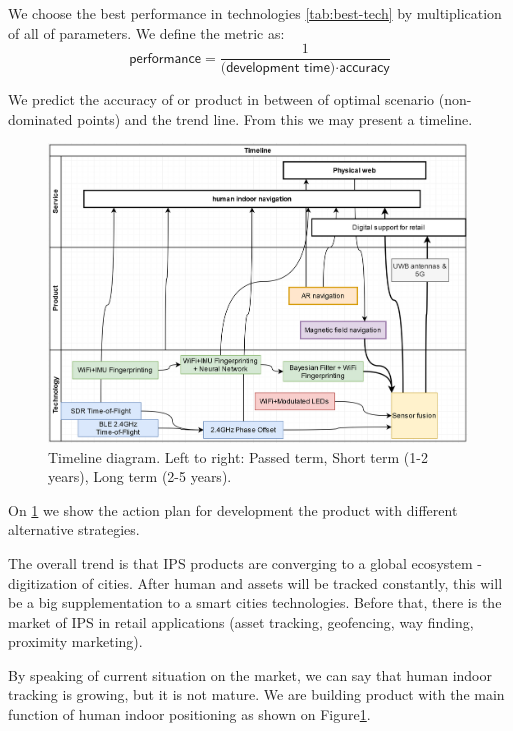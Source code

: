 We choose the best performance in technologies \ref{tab:best-tech} by multiplication of all of parameters.
We define the metric as:
\begin{equation*}
	\textsf{performance} = \frac{1}{\textsf{(development time)} \cdot \textsf{accuracy}}
\end{equation*}

We predict the accuracy of or product in between of optimal scenario (non-dominated points) and the trend line. From this we may present a timeline.

\begin{figure}[t]
	\centering
	\includegraphics[width=0.99\textwidth]{graphics/roadmap/timeline.png}
	\caption{Timeline diagram. Left to right: Passed term, Short term (1-2 years), Long term (2-5 years).}
	\label{fig:timeline}
\end{figure}

On \ref{fig:timeline} we show the action plan for development the product with different alternative strategies.

The overall trend is that IPS products are converging to a global ecosystem - digitization of cities. After human and assets will be tracked constantly, this will be a big supplementation to a smart cities technologies.
Before that, there is the market of IPS in retail applications (asset tracking, geofencing, way finding, proximity marketing)\cite{Infsoft_wp}.

By speaking of current situation on the market, we can say that human indoor tracking is growing, but it is not mature.
We are building product with the main function of human indoor positioning as shown on Figure\ref{fig:timeline}.

